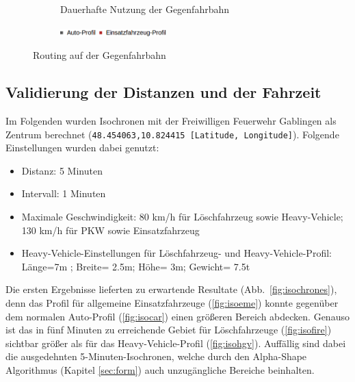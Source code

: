 \begin{figure}[htb]
\begin{subfigure}{0.49\textwidth}
\caption{Dauerhafte Nutzung der Gegenfahrbahn}
\label{fig:oppositelane}
\end{subfigure}
\begin{subfigure}{0.90\textwidth}
\centering
\includegraphics[width = 0.45\textwidth]{../media/legend4.png} \\
\end{subfigure}
\caption{Routing auf der Gegenfahrbahn}
\label{fig:opposite}
\end{figure}

\newpage
\subsection{Validierung der Distanzen und der Fahrzeit}

Im Folgenden wurden Isochronen mit der Freiwilligen Feuerwehr Gablingen als Zentrum berechnet (\texttt{48.454063,10.824415 [Latitude, Longitude]}).
Folgende Einstellungen wurden dabei genutzt:
\sloppy
\begin{itemize}
\item Distanz: 5 Minuten
\item Intervall: 1 Minuten
\item Maximale Geschwindigkeit: 80 km/h für Löschfahrzeug sowie Heavy-Vehicle; 130 km/h für PKW sowie Einsatzfahrzeug
\item Heavy-Vehicle-Einstellungen für Löschfahrzeug- und Heavy-Vehicle-Profil: Länge=7m ; Breite= 2.5m; Höhe= 3m; Gewicht= 7.5t
\end{itemize}
\fussy

Die ersten Ergebnisse lieferten zu erwartende Resultate (Abb.~\ref{fig:isochrones}), denn das Profil für allgemeine Einsatzfahrzeuge (\ref{fig:isoeme}) konnte gegenüber dem normalen Auto-Profil (\ref{fig:isocar}) einen größeren Bereich abdecken.
Genauso ist das in fünf Minuten zu erreichende Gebiet für Löschfahrzeuge (\ref{fig:isofire}) sichtbar größer als für das Heavy-Vehicle-Profil (\ref{fig:isohgv}).
Auffällig sind dabei die ausgedehnten 5-Minuten-Isochronen, welche durch den Alpha-Shape Algorithmus (Kapitel \ref{sec:form}) auch unzugängliche Bereiche beinhalten.

